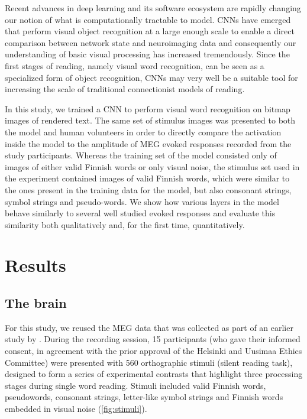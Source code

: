 \documentclass[a4paper, 10pt]{vanvliet_paper}
\begin{document}
Recent advances in deep learning and its software ecosystem are rapidly changing our notion of what is computationally tractable to model\cite{Richards2019}.
\Glspl{CNN} have emerged that perform visual object recognition at a large enough scale to enable a direct comparison between network state and neuroimaging data\cite{Schrimpf2018, Devereux2018, Yamins2016} and consequently our understanding of basic visual processing has increased tremendously\cite{Lindsay2020}.
Since the first stages of reading, namely visual word recognition, can be seen as a specialized form of object recognition, \glspl{CNN} may very well be a suitable tool for increasing the scale of traditional connectionist models of reading.

In this study, we trained a \gls{CNN} to perform visual word recognition on bitmap images of rendered text.
The same set of stimulus images was presented to both the model and human volunteers in order to directly compare the activation inside the model to the amplitude of \gls{MEG} evoked responses recorded from the study participants.
Whereas the training set of the model consisted only of images of either valid Finnish words or only visual noise, the stimulus set used in the experiment contained images of valid Finnish words, which were similar to the ones present in the training data for the model, but also consonant strings, symbol strings and pseudo-words.
We show how various layers in the model behave similarly to several well studied evoked responses and evaluate this similarity both qualitatively and, for the first time, quantitatively.

\section{Results}

\subsection{The brain}

For this study, we reused the \gls{MEG} data that was collected as part of an earlier study by \textcite{Vartiainen2011}.
During the recording session, 15 participants (who gave their informed consent, in agreement with the prior approval of the Helsinki and Uusimaa Ethics Committee) were presented with 560 orthographic stimuli (silent reading task), designed to form a series of experimental contrasts that highlight three processing stages during single word reading.
Stimuli included valid Finnish words, pseudowords, consonant strings, letter-like symbol strings and Finnish words embedded in visual noise (\autoref{fig:stimuli}).
\end{document}
